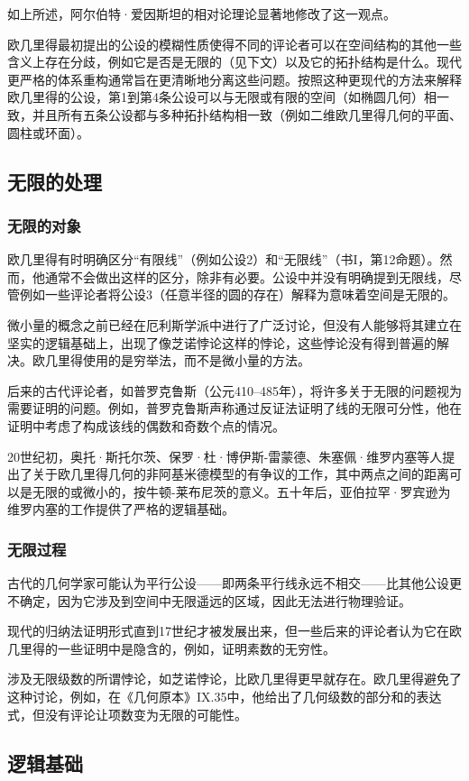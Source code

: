 如上所述，阿尔伯特·爱因斯坦的相对论理论显著地修改了这一观点。

欧几里得最初提出的公设的模糊性质使得不同的评论者可以在空间结构的其他一些含义上存在分歧，例如它是否是无限的（见下文）以及它的拓扑结构是什么。现代更严格的体系重构通常旨在更清晰地分离这些问题。按照这种更现代的方法来解释欧几里得的公设，第1到第4条公设可以与无限或有限的空间（如椭圆几何）相一致，并且所有五条公设都与多种拓扑结构相一致（例如二维欧几里得几何的平面、圆柱或环面）。
\subsection{无限的处理}
\subsubsection{无限的对象}
欧几里得有时明确区分“有限线”（例如公设2）和“无限线”（书I，第12命题）。然而，他通常不会做出这样的区分，除非有必要。公设中并没有明确提到无限线，尽管例如一些评论者将公设3（任意半径的圆的存在）解释为意味着空间是无限的。

微小量的概念之前已经在厄利斯学派中进行了广泛讨论，但没有人能够将其建立在坚实的逻辑基础上，出现了像芝诺悖论这样的悖论，这些悖论没有得到普遍的解决。欧几里得使用的是穷举法，而不是微小量的方法。

后来的古代评论者，如普罗克鲁斯（公元410–485年），将许多关于无限的问题视为需要证明的问题。例如，普罗克鲁斯声称通过反证法证明了线的无限可分性，他在证明中考虑了构成该线的偶数和奇数个点的情况。

20世纪初，奥托·斯托尔茨、保罗·杜·博伊斯-雷蒙德、朱塞佩·维罗内塞等人提出了关于欧几里得几何的非阿基米德模型的有争议的工作，其中两点之间的距离可以是无限的或微小的，按牛顿-莱布尼茨的意义。五十年后，亚伯拉罕·罗宾逊为维罗内塞的工作提供了严格的逻辑基础。
\subsubsection{无限过程}
古代的几何学家可能认为平行公设——即两条平行线永远不相交——比其他公设更不确定，因为它涉及到空间中无限遥远的区域，因此无法进行物理验证。

现代的归纳法证明形式直到17世纪才被发展出来，但一些后来的评论者认为它在欧几里得的一些证明中是隐含的，例如，证明素数的无穷性。

涉及无限级数的所谓悖论，如芝诺悖论，比欧几里得更早就存在。欧几里得避免了这种讨论，例如，在《几何原本》IX.35中，他给出了几何级数的部分和的表达式，但没有评论让项数变为无限的可能性。
\subsection{逻辑基础}
